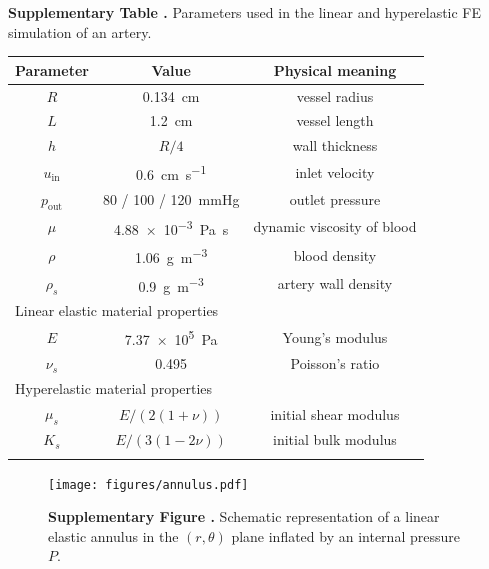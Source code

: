 \documentclass{frontiers_suppmat} %
\begin{document}
\begin{table}[h]
\textbf{\label{tab:airy_sim} Supplementary Table .}{ Parameters used in the linear and hyperelastic FE simulation of an artery. }

\processtable{ }
{\begin{tabular}{ccc}\toprule
Parameter & Value & Physical meaning \\\midrule
$R$ & \SI{0.134}{\centi\metre} & vessel radius\\
$L$ & \SI{1.2}{\centi\metre} & vessel length\\
$h$ & $R/4$ & wall thickness\\
$u_\text{in}$ & \SI{0.6}{\centi\metre\per\second} & inlet velocity\\
$p_\text{out}$ & 80 / 100 / \SI{120}{\mmHg} & outlet pressure\\
$\mu$ & \SI{4.88e-3}{\pascal\second} & dynamic viscosity of blood\\
$\rho$ & \SI{1.06}{\gram\per\cubic\metre} & blood density\\
$\rho_s$ & \SI{0.9}{\gram\per\cubic\metre} & artery wall density\\
\midrule
\multicolumn{3}{l}{Linear elastic material properties}\\
\midrule
$E$ & \SI{7.37e5}{Pa} & Young's modulus\\
$\nu_s$ & 0.495 & Poisson's ratio\\
\midrule
\multicolumn{3}{l}{Hyperelastic material properties}\\
\midrule
$\mu_s$ & $E / (2 (1 + \nu))$ & initial shear modulus\\
$K_s$ & $E / (3 (1 - 2\nu))$ & initial bulk modulus\\\botrule
\end{tabular}}{}
\end{table}

\begin{figure}
\begin{center}
\texttt{[image: figures/annulus.pdf]}%
\end{center}
\textbf{\label{fig:annulus} Supplementary Figure .}{ Schematic representation of a linear elastic annulus in the $(r, \theta)$ plane inflated by an internal pressure $P$. }
\end{figure}
\end{document}
